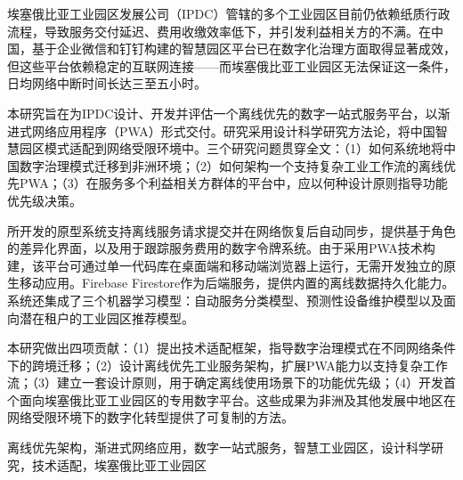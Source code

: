 
\begin{zhaiyao}

埃塞俄比亚工业园区发展公司（IPDC）管辖的多个工业园区目前仍依赖纸质行政流程，导致服务交付延迟、费用收缴效率低下，并引发利益相关方的不满。在中国，基于企业微信和钉钉构建的智慧园区平台已在数字化治理方面取得显著成效，但这些平台依赖稳定的互联网连接——而埃塞俄比亚工业园区无法保证这一条件，日均网络中断时间长达三至五小时。

本研究旨在为IPDC设计、开发并评估一个离线优先的数字一站式服务平台，以渐进式网络应用程序（PWA）形式交付。研究采用设计科学研究方法论，将中国智慧园区模式适配到网络受限环境中。三个研究问题贯穿全文：（1）如何系统地将中国数字治理模式迁移到非洲环境；（2）如何架构一个支持复杂工业工作流的离线优先PWA；（3）在服务多个利益相关方群体的平台中，应以何种设计原则指导功能优先级决策。

所开发的原型系统支持离线服务请求提交并在网络恢复后自动同步，提供基于角色的差异化界面，以及用于跟踪服务费用的数字令牌系统。由于采用PWA技术构建，该平台可通过单一代码库在桌面端和移动端浏览器上运行，无需开发独立的原生移动应用。Firebase Firestore作为后端服务，提供内置的离线数据持久化能力。系统还集成了三个机器学习模型：自动服务分类模型、预测性设备维护模型以及面向潜在租户的工业园区推荐模型。

本研究做出四项贡献：（1）提出技术适配框架，指导数字治理模式在不同网络条件下的跨境迁移；（2）设计离线优先工业服务架构，扩展PWA能力以支持复杂工作流；（3）建立一套设计原则，用于确定离线使用场景下的功能优先级；（4）开发首个面向埃塞俄比亚工业园区的专用数字平台。这些成果为非洲及其他发展中地区在网络受限环境下的数字化转型提供了可复制的方法。

\end{zhaiyao}

\begin{guanjianci}
离线优先架构，渐进式网络应用，数字一站式服务，智慧工业园区，设计科学研究，技术适配，埃塞俄比亚工业园区
\end{guanjianci}


